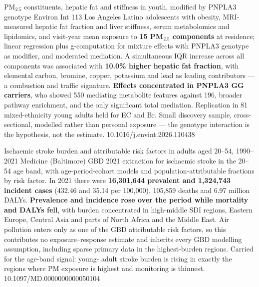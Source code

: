 \documentclass[10pt]{article}
\begin{document}

{PM$_{2.5}$ constituents, hepatic fat and stiffness in youth, modified by PNPLA3 genotype}
{Environ Int}
{113 Los Angeles Latino adolescents with obesity, MRI-measured hepatic fat fraction and
liver stiffness, serum metabolomics and lipidomics, and visit-year mean exposure to
\textbf{15 PM$_{2.5}$ components} at residence; linear regression plus g-computation for
mixture effects with PNPLA3 genotype as modifier, and moderated mediation. A simultaneous
IQR increase across all components was associated with \textbf{10.0\% higher hepatic fat
fraction}, with elemental carbon, bromine, copper, potassium and lead as leading
contributors --- a combustion and traffic signature. \textbf{Effects concentrated in PNPLA3
GG carriers}, who showed 550 mediating metabolite features against 196, broader pathway
enrichment, and the only significant total mediation. Replication in 81 mixed-ethnicity
young adults held for EC and Br. Small discovery sample, cross-sectional, modelled rather
than personal exposure --- the genotype interaction is the hypothesis, not the estimate.}
{10.1016/j.envint.2026.110438}

{Ischaemic stroke burden and attributable risk factors in adults aged 20--54, 1990--2021}
{Medicine (Baltimore)}
{GBD 2021 extraction for ischaemic stroke in the 20--54 age band, with age-period-cohort
models and population-attributable fractions by risk factor. In 2021 there were
\textbf{16{,}301{,}644 prevalent and 1{,}324{,}743 incident cases} (432.46 and 35.14 per
100{,}000), 105{,}859 deaths and 6.97 million DALYs. \textbf{Prevalence and incidence rose
over the period while mortality and DALYs fell}, with burden concentrated in high-middle
SDI regions, Eastern Europe, Central Asia and parts of North Africa and the Middle East.
Air pollution enters only as one of the GBD attributable risk factors, so this contributes
no exposure--response estimate and inherits every GBD modelling assumption, including
sparse primary data in the highest-burden regions. Carried for the age-band signal: young-
adult stroke burden is rising in exactly the regions where PM exposure is highest and
monitoring is thinnest.}
{10.1097/MD.0000000000050104}

\end{document}
